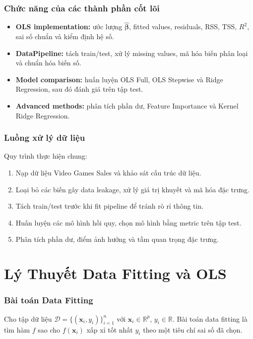 \documentclass[12pt,a4paper]{article}
\begin{document}
\section{Chức năng của các thành phần cốt lõi}
\begin{itemize}
    \item \textbf{OLS implementation:} ước lượng $\hat{\boldsymbol{\beta}}$, fitted values, residuals, RSS, TSS, $R^2$, sai số chuẩn và kiểm định hệ số.
    \item \textbf{DataPipeline:} tách train/test, xử lý missing values, mã hóa biến phân loại và chuẩn hóa biến số.
    \item \textbf{Model comparison:} huấn luyện OLS Full, OLS Stepwise và Ridge Regression, sau đó đánh giá trên tập test.
    \item \textbf{Advanced methods:} phân tích phần dư, Feature Importance và Kernel Ridge Regression.
\end{itemize}

\section{Luồng xử lý dữ liệu}
Quy trình thực hiện chung:
\begin{enumerate}
    \item Nạp dữ liệu Video Games Sales và khảo sát cấu trúc dữ liệu.
    \item Loại bỏ các biến gây data leakage, xử lý giá trị khuyết và mã hóa đặc trưng.
    \item Tách train/test trước khi fit pipeline để tránh rò rỉ thông tin.
    \item Huấn luyện các mô hình hồi quy, chọn mô hình bằng metric trên tập test.
    \item Phân tích phần dư, điểm ảnh hưởng và tầm quan trọng đặc trưng.
\end{enumerate}

\part{Lý Thuyết Data Fitting và OLS}

\section{Bài toán Data Fitting}
Cho tập dữ liệu $\mathcal{D} = \{(\mathbf{x}_i, y_i)\}_{i=1}^{n}$ với $\mathbf{x}_i \in \mathbb{R}^p$, $y_i \in \mathbb{R}$. Bài toán data fitting là tìm hàm $f$ sao cho $f(\mathbf{x}_i)$ xấp xỉ tốt nhất $y_i$ theo một tiêu chí sai số đã chọn.
\end{document}
